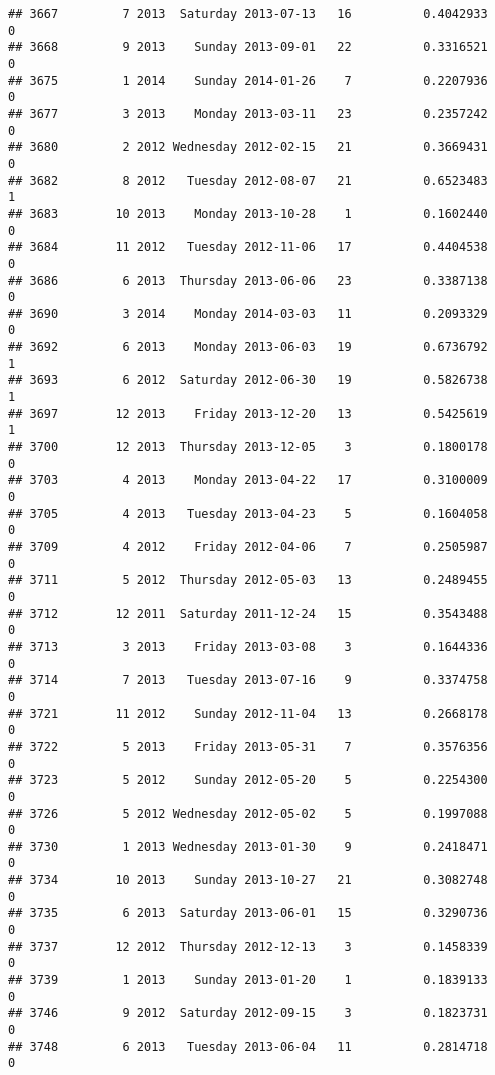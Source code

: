 \documentclass[
]{article}
\begin{document}
\begin{verbatim}
## 3667         7 2013  Saturday 2013-07-13   16          0.4042933             0
## 3668         9 2013    Sunday 2013-09-01   22          0.3316521             0
## 3675         1 2014    Sunday 2014-01-26    7          0.2207936             0
## 3677         3 2013    Monday 2013-03-11   23          0.2357242             0
## 3680         2 2012 Wednesday 2012-02-15   21          0.3669431             0
## 3682         8 2012   Tuesday 2012-08-07   21          0.6523483             1
## 3683        10 2013    Monday 2013-10-28    1          0.1602440             0
## 3684        11 2012   Tuesday 2012-11-06   17          0.4404538             0
## 3686         6 2013  Thursday 2013-06-06   23          0.3387138             0
## 3690         3 2014    Monday 2014-03-03   11          0.2093329             0
## 3692         6 2013    Monday 2013-06-03   19          0.6736792             1
## 3693         6 2012  Saturday 2012-06-30   19          0.5826738             1
## 3697        12 2013    Friday 2013-12-20   13          0.5425619             1
## 3700        12 2013  Thursday 2013-12-05    3          0.1800178             0
## 3703         4 2013    Monday 2013-04-22   17          0.3100009             0
## 3705         4 2013   Tuesday 2013-04-23    5          0.1604058             0
## 3709         4 2012    Friday 2012-04-06    7          0.2505987             0
## 3711         5 2012  Thursday 2012-05-03   13          0.2489455             0
## 3712        12 2011  Saturday 2011-12-24   15          0.3543488             0
## 3713         3 2013    Friday 2013-03-08    3          0.1644336             0
## 3714         7 2013   Tuesday 2013-07-16    9          0.3374758             0
## 3721        11 2012    Sunday 2012-11-04   13          0.2668178             0
## 3722         5 2013    Friday 2013-05-31    7          0.3576356             0
## 3723         5 2012    Sunday 2012-05-20    5          0.2254300             0
## 3726         5 2012 Wednesday 2012-05-02    5          0.1997088             0
## 3730         1 2013 Wednesday 2013-01-30    9          0.2418471             0
## 3734        10 2013    Sunday 2013-10-27   21          0.3082748             0
## 3735         6 2013  Saturday 2013-06-01   15          0.3290736             0
## 3737        12 2012  Thursday 2012-12-13    3          0.1458339             0
## 3739         1 2013    Sunday 2013-01-20    1          0.1839133             0
## 3746         9 2012  Saturday 2012-09-15    3          0.1823731             0
## 3748         6 2013   Tuesday 2013-06-04   11          0.2814718             0

\end{verbatim}
\end{document}
